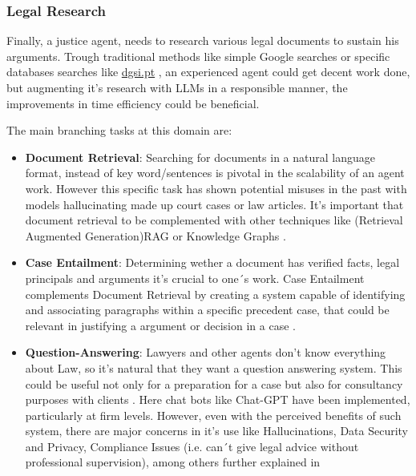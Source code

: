 \documentclass[11pt,a4paper,twoside,openright]{book}
\begin{document}
\subsubsection{Legal Research}
Finally, a justice agent, needs to research various legal documents to sustain his arguments. Trough traditional methods like simple Google searches or specific databases searches like \href{https://www.dgsi.pt/}{dgsi.pt} , an experienced agent could get decent work done, but augmenting it's research with LLMs in a responsible manner, the improvements in time efficiency could be beneficial.
\par The main branching tasks at this domain are:

\begin{itemize}
    \item \textbf{Document Retrieval}: Searching for documents in a natural language format, instead of key word/sentences is pivotal in the scalability of an agent work. However this specific task has shown potential misuses in the past with models hallucinating made up court cases or law articles. It's important that document retrieval to be complemented with other techniques like (Retrieval Augmented Generation)RAG or Knowledge Graphs \parencite{siino_Lit_review_LLMs_2025, shao_llms_meet_law_2025}.

    \item \textbf{Case Entailment}: Determining wether a document has verified facts, legal principals and arguments it's crucial to one´s work. Case Entailment complements Document Retrieval by creating a system capable of identifying and associating paragraphs within a specific precedent case, that could be relevant in justifying a argument or decision in a case \parencite{siino_Lit_review_LLMs_2025, shao_llms_meet_law_2025}.

    \item \textbf{Question-Answering}: Lawyers and other agents don't know everything about Law, so it's natural that they want a question answering system. This could be useful not only for a preparation for a case but also for consultancy purposes with clients \parencite{siino_Lit_review_LLMs_2025, shao_llms_meet_law_2025}. Here chat bots like Chat-GPT have been implemented, particularly at firm levels. However, even with the perceived benefits of such system, there are major concerns in it's use like Hallucinations, Data Security and Privacy, Compliance Issues (i.e. can´t give legal advice without professional supervision), among others further explained in \textcite{homoki_llms_use_cases_2024}
    
\end{itemize}
\end{document}

